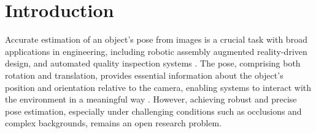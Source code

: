 \section{Introduction}
\label{sec:intro}

Accurate estimation of an object's pose from images is a crucial task with broad applications in engineering, including robotic assembly \DIFdelbegin {}\DIFdelend \DIFaddbegin {}\DIFaddend augmented reality-driven design\DIFdelbegin {}\DIFdelend , and automated quality inspection systems \DIFdelbegin {}\DIFdelend \DIFaddbegin {}\DIFaddend . The pose, comprising both rotation and translation, provides essential information about the object's position and orientation relative to the camera, enabling systems to interact with the environment in a meaningful way \DIFdelbegin {}\DIFdelend \DIFaddbegin {}\DIFaddend . However, achieving robust and precise pose estimation, especially under challenging conditions such as occlusions and complex backgrounds, remains an open research problem\DIFdelbegin {}\DIFdelend . 

